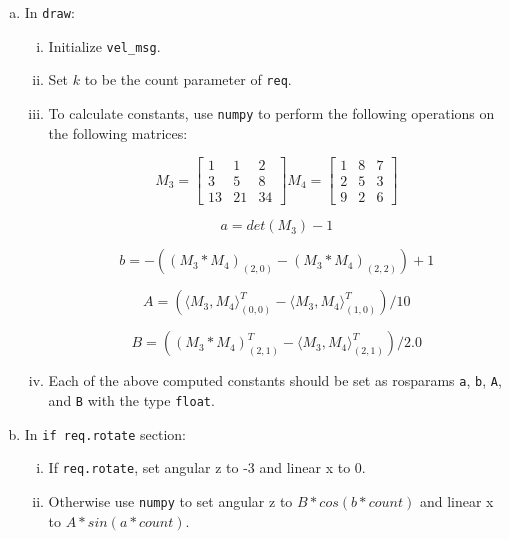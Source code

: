 \begin{enumerate}[(a)]
  \item In \texttt{draw}:
  \begin{enumerate}[i.]
    \item Initialize \texttt{vel\_msg}.
    \item Set $k$ to be the count parameter of \texttt{req}. %
    \item To calculate constants, use \texttt{numpy} to perform the following operations on the
    following matrices:

    $$M_3 = \begin{bmatrix} 
      1 & 1 & 2\\
      3 & 5 & 8 \\
      13 & 21 & 34
    \end{bmatrix} 
    M_4 = \begin{bmatrix} 
      1 & 8 & 7\\
      2 & 5 & 3 \\
      9 & 2 & 6
    \end{bmatrix}$$
    
    $$a = det(M_3) -1$$
    
    $$b = -((M_3*M_4)_{(2,0)}-(M_3*M_4)_{(2,2)}) +1$$
    
    $$A = (\langle M_3, M_4 \rangle^T_{(0,0)} - \langle M_3,M_4 \rangle^T_{(1,0)})/10$$
    
    $$B = ((M_3*M_4)^T_{(2,1)}-\langle M_3,M_4 \rangle^T_{(2,1)})/2.0 $$
    
    \item Each of the above computed constants should be set as rosparams \texttt{a}, \texttt{b},
    \texttt{A}, and \texttt{B} with the type \texttt{float}.

  \end{enumerate}

  \item In \texttt{if req.rotate} section:
  \begin{enumerate}[i.]
    \item If \texttt{req.rotate}, set angular z to -3 and linear x to 0.
    \item Otherwise use \texttt{numpy} to set angular z to $B*cos(b*count)$ and linear x to $A*sin(a*count)$.
  \end{enumerate}


\end{enumerate}
